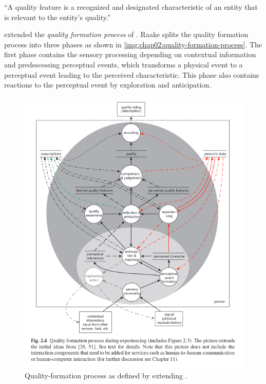 \begin{definition}
``A quality feature is a recognized and designated characteristic of an entity that is relevant to the entity's quality.''~\cite[p. 17]{jekosch_voice_2005}
\end{definition}

\cite{raake_speech_2006, moller_quality_2014} extended the \emph{quality formation process} of \cite{jekosch_voice_2005}.
Raake splits the quality formation process into three phases as shown in \autoref{img:chap02:quality-formation-process}.
The first phase contains the sensory processing depending on contextual information and predescessing perceptual events, which transforms a physical event to a perceptual event leading to the perceived characteristic.
This phase also contains reactions to the perceptual event by exploration and anticipation.

\begin{figure}
	\includegraphics[width=1\textwidth]{fig/quality-formation-process}
	\caption{Quality-formation process as defined by \cite{moller_quality_2014} extending \cite{jekosch_voice_2005}.}
	\label{img:chap02:quality-formation-process}
\end{figure}

